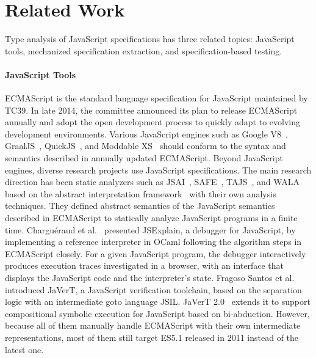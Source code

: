 \section{Related Work}\label{sec:related}

Type analysis of JavaScript specifications has three related topics:
JavaScript tools, mechanized specification extraction, and specification-based testing.

\paragraph{JavaScript Tools}
ECMAScript is the standard language specification for JavaScript maintained by
TC39.  In late 2014, the committee announced
its plan to release ECMAScript annually and adopt the open development process
to quickly adapt to evolving development environments.  Various JavaScript engines such
as Google V8~\cite{v8}, GraalJS~\cite{graaljs}, QuickJS~\cite{qjs}, and Moddable
XS~\cite{moddable} should conform to the syntax and semantics described in
annually updated ECMAScript.  Beyond JavaScript engines, diverse
research projects use JavaScript specifications.  The main research direction
has been static analyzers such as JSAI~\cite{jsai}, SAFE~\cite{safe},
TAJS~\cite{tajs}, and WALA~\cite{wala} based on the abstract interpretation
framework~\cite{ai1977, ai1992} with their own analysis techniques.
They defined abstract semantics of the JavaScript semantics described in ECMAScript to statically
analyze JavaScript programs in a finite time.
Chargu{\'e}raud et al.~\cite{jsexplain} presented JSExplain, a debugger for JavaScript, by
implementing a reference interpreter in OCaml following the algorithm steps in ECMAScript closely.
For a given JavaScript program, the debugger interactively produces execution traces
investigated in a browser, with an interface that displays the
JavaScript code and the interpreter's state.
Fragoso Santos et al.~\cite{javert} introduced JaVerT, a JavaScript verification toolchain, based
on the separation logic with an intermediate goto language JSIL.
JaVerT 2.0~\cite{javert2} extends it to support compositional symbolic execution
for JavaScript based on bi-abduction.  However, because all of them manually handle
ECMAScript with their own intermediate representations, most of them still 
target ES5.1 released in 2011 instead of the latest one.


